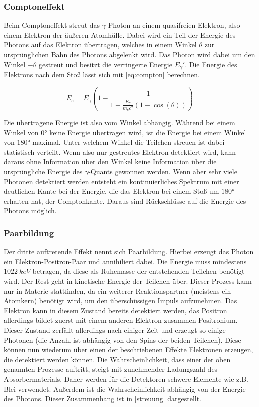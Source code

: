 \subsubsection{Comptoneffekt}
Beim Comptoneffekt streut das $\gamma$-Photon an einem quasifreien Elektron, also einem Elektron der äußeren Atomhülle. Dabei wird ein Teil der Energie des Photons auf das Elektron übertragen, welches in einem Winkel $\theta$ zur ursprünglichen Bahn des Photons abgelenkt wird. Das Photon wird dabei um den Winkel $-\theta$ gestreut und besitzt die verringerte Energie $E_\gamma'$. Die Energie des Elektrons nach dem Stoß lässt sich mit \cref{eq:compton} berechnen.

\begin{equation}
	E_e = E_\gamma \left( 1-\frac{1}{1 + \frac{E_\gamma}{m_ec^2}\left( 1-\cos\left(\theta\right)\right)}\right)
	\label{eq:compton}
\end{equation}

Die übertragene Energie ist also vom Winkel abhängig. Während bei einem Winkel von $0$° keine Energie übertragen wird, ist die Energie bei einem Winkel von $180$° maximal. Unter welchem Winkel die Teilchen streuen ist dabei statistisch verteilt. Wenn also nur gestreutes Elektron detektiert wird, kann daraus ohne Information über den Winkel keine Information über die ursprüngliche Energie des $\gamma$-Quants gewonnen werden. Wenn aber sehr viele Photonen detektiert werden entsteht ein kontinuierliches Spektrum mit einer deutlichen Kante bei der Energie, die das Elektron bei einem Stoß um $180$° erhalten hat, der Comptonkante. Daraus sind Rückschlüsse auf die Energie des Photons möglich.

\subsubsection{Paarbildung}
Der dritte auftretende Effekt nennt sich Paarbildung. Hierbei erzeugt das Photon ein Elektron-Positron-Paar und annihiliert dabei. Die Energie muss mindestens $\SI{1022}{keV}$ betragen, da diese als Ruhemasse der entstehenden Teilchen benötigt wird. Der Rest geht in kinetische Energie der Teilchen über. Dieser Prozess kann nur in Materie stattfinden, da ein weiterer Reaktionspartner (meistens ein Atomkern) benötigt wird, um den überschüssigen Impuls aufzunehmen. Das Elektron kann in diesem Zustand bereits detektiert werden, das Positron allerdings bildet zuerst mit einem anderen Elektron zusammen Positronium. Dieser Zustand zerfällt allerdings nach einiger Zeit und erzeugt so einige Photonen (die Anzahl ist abhängig von den Spins der beiden Teilchen). Diese können nun wiederum über einen der beschriebenen Effekte Elektronen erzeugen, die detektiert werden können. Die Wahrscheinlichkeit, dass einer der oben genannten Prozesse auftritt, steigt mit zunehmender Ladungszahl des Absorbermaterials. Daher werden für die Detektoren schwere Elemente wie z.B. Blei verwendet. Außerdem ist die Wahrscheinlichkeit abhängig von der Energie des Photons. Dieser Zusammenhang ist in \cref{streuung} dargestellt.

